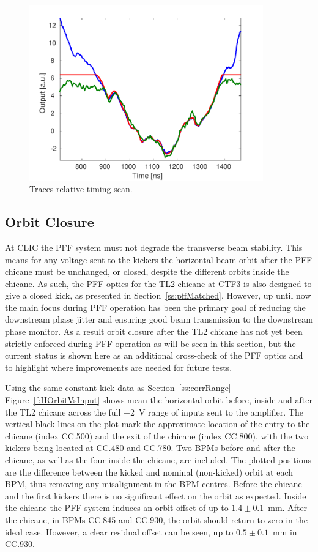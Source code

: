 \begin{figure}
  \centering
  \includegraphics[width=0.9\textwidth]{Figures/commissioning/pffKickShape}
  \caption{Traces relative timing scan.}
  \label{f:pffKickShape}
\end{figure}

\subsection{Orbit Closure}
\label{ss:orbitClosure}

At CLIC the PFF system must not degrade the transverse beam stability. This means for any voltage sent to the kickers the horizontal beam orbit after the PFF chicane must be unchanged, or closed, despite the different orbits inside the chicane. As such, the PFF optics for the TL2 chicane at CTF3 is also designed to give a closed kick, as presented in Section~\ref{ss:pffMatched}. However, up until now the main focus during PFF operation has been the primary goal of reducing the downstream phase jitter and ensuring good beam transmission to the downstream phase monitor. As a result orbit closure after the TL2 chicane has not yet been strictly enforced during PFF operation as will be seen in this section, but the current status is shown here as an additional cross-check of the PFF optics and to highlight where improvements are needed for future tests.

Using the same constant kick data as Section~\ref{ss:corrRange} Figure~\ref{f:HOrbitVsInput} shows mean the horizontal orbit before, inside and after the TL2 chicane across the full \(\pm2\)~V range of inputs sent to the amplifier. The vertical black lines on the plot mark the approximate location of the entry to the chicane (index CC.500) and the exit of the chicane (index CC.800), with the two kickers being located at CC.480 and CC.780. Two BPMs before and after the chicane, as well as the four inside the chicane, are included. The plotted positions are the difference between the kicked and nominal (non-kicked) orbit at each BPM, thus removing any misalignment in the BPM centres. Before the chicane and the first kickers there is no significant effect on the orbit as expected. Inside the chicane the PFF system induces an orbit offset of up to \(1.4\pm0.1\)~mm. After the chicane, in BPMs CC.845 and CC.930, the orbit should return to zero in the ideal case. However, a clear residual offset can be seen, up to \(0.5\pm0.1\)~mm in CC.930.

